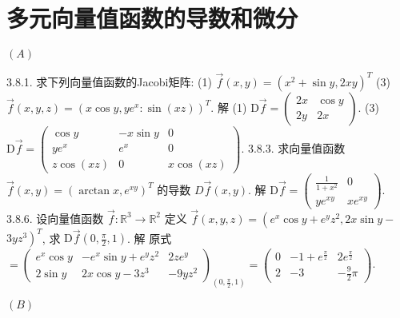 \documentclass[a4paper,11pt,UTF8]{article}
\begin{document}
\section{多元向量值函数的导数和微分}
\centerline{$(A)$}
3.8.1. 求下列向量值函数的Jacobi矩阵:
(1) $\vec{f}(x, y)=\left(x^2+\sin y, 2 x y\right)^T$
(3) $\vec{f}(x, y, z)=\left(x \cos y, y e^x: \sin (x z)\right)^T$.
解 (1) $\mathrm{D} \vec{f}=\left(\begin{array}{cc}2 x & \cos y \\ 2 y & 2 x\end{array}\right)$. (3) $\mathrm{D} \vec{f}=\left(\begin{array}{ccc}\cos y & -x \sin y & 0 \\ y e^x & e^x & 0 \\ z \cos (x z) & 0 & x \cos (x z)\end{array}\right)$.
3.8.3. 求向量值函数 $\vec{f}(x, y)=\left(\arctan x, e^{x y}\right)^T$ 的导数 $D \vec{f}(x, y)$.
解 $\mathrm{D} \vec{f}=\left(\begin{array}{cc}\frac{1}{1+x^2} & 0 \\ y e^{x y} & x e^{x y}\end{array}\right)$.\\
3.8.6. 设向量值函数 $\vec{f}: \mathbb{R}^3 \rightarrow \mathbb{R}^2$ 定义 $\vec{f}(x, y, z)=\left(e^x \cos y+e^y z^2, 2 x \sin y-\right.$ $\left.3 y z^3\right)^T$, 求 $\mathrm{D} \vec{f}\left(0, \frac{\pi}{2}, 1\right)$.
解 原式 $=\left(\begin{array}{ccc}e^x \cos y & -e^x \sin y+e^y z^2 & 2 z e^y \\ 2 \sin y & 2 x \cos y-3 z^3 & -9 y z^2\end{array}\right)_{\left(0, \frac{\pi}{2}, 1\right)}=\left(\begin{array}{ccc}0 & -1+e^{\frac{\pi}{2}} & 2 e^{\frac{\pi}{2}} \\ 2 & -3 & -\frac{9}{2} \pi\end{array}\right)$.\\
\centerline{$(B)$}
\newpage
\noindent
\end{document}
